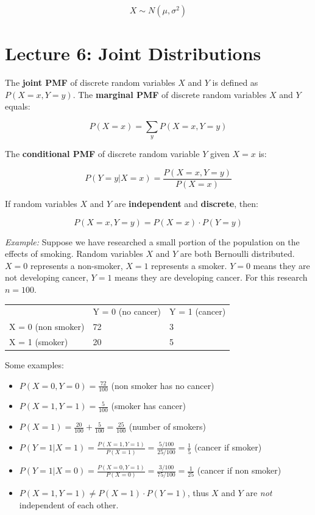 \documentclass[12pt]{article}
\begin{document}
\[ X \sim N(\mu, \sigma^2) \]

%
%
\newpage
\section*{Lecture 6: Joint Distributions}
The \textbf{joint PMF} of discrete random variables $X$ and $Y$ is defined as \\$P(X = x, Y = y)$.
The \textbf{marginal PMF} of discrete random variables $X$ and $Y$ equals:

\[ P(X = x) = \sum_{y} P(X = x, Y = y) \]

\noindent
The \textbf{conditional PMF} of discrete random variable $Y$ given $X = x$ is:

\[ P(Y = y | X = x) = \frac{P(X = x, Y = y)}{P(X = x)} \]

\noindent
If random variables $X$ and $Y$ are \textbf{independent} and \textbf{discrete}, then:

\[ P(X = x, Y = y) = P(X = x) \cdot P(Y = y) \]

\noindent
\textit{Example:}
Suppose we have researched a small portion of the population on the effects of smoking.
Random variables $X$ and $Y$ are both Bernoulli distributed.
$X = 0$ represents a non-smoker, $X = 1$ represents a smoker.
$Y = 0$ means they are not developing cancer, $Y = 1$ means they are developing cancer.
For this research $n = 100$.

\begin{table}[h]
    \centering
    \begin{tabular}{lll}
    & Y = 0 (no cancer) & Y = 1 (cancer) \\
    X = 0 (non smoker) & 72 & 3 \\
    X = 1 (smoker) & 20  & 5
    \end{tabular}
\end{table}

\noindent
Some examples:

\begin{itemize}
    \item $P(X = 0, Y = 0) = \frac{72}{100}$ (non smoker has no cancer)
    \item $P(X = 1, Y = 1) = \frac{5}{100}$ (smoker has cancer)
    \item $P(X = 1) = \frac{20}{100} + \frac{5}{100} = \frac{25}{100}$ (number of smokers)
    \item $P(Y = 1 | X = 1) = \frac{P(X = 1, Y = 1)}{P(X = 1)} = \frac{5/100}{25/100} = \frac{1}{5}$ (cancer if smoker)
    \item $P(Y = 1 | X = 0) = \frac{P(X = 0, Y = 1)}{P(X = 0)} = \frac{3/100}{75/100} = \frac{1}{25}$ (cancer if non smoker)
    \item $P(X = 1, Y = 1) \neq P(X = 1) \cdot P(Y = 1)$, thus $X$ and $Y$ are \textit{not} independent of each other.
\end{itemize}
\end{document}
